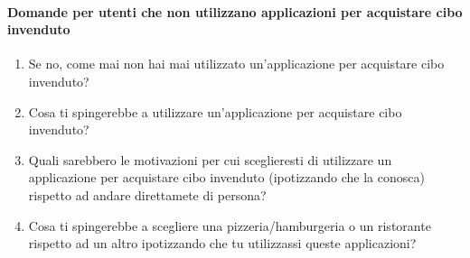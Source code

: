 \documentclass{article}
\begin{document}
\paragraph{Domande per utenti che non utilizzano applicazioni per acquistare cibo invenduto}
\label{dom_non_utilizzatori}
\begin{enumerate}
    \item Se no, come mai non hai mai utilizzato un'applicazione per acquistare cibo invenduto?
    \item Cosa ti spingerebbe a utilizzare un'applicazione per acquistare cibo invenduto?
    \item Quali sarebbero le motivazioni per cui sceglieresti di utilizzare un applicazione per acquistare cibo invenduto (ipotizzando che la conosca) rispetto ad andare direttamete di persona?
    \item Cosa ti spingerebbe a scegliere una pizzeria/hamburgeria o un ristorante rispetto ad un altro ipotizzando che tu utilizzassi queste applicazioni?
\end{enumerate}
\end{document}
